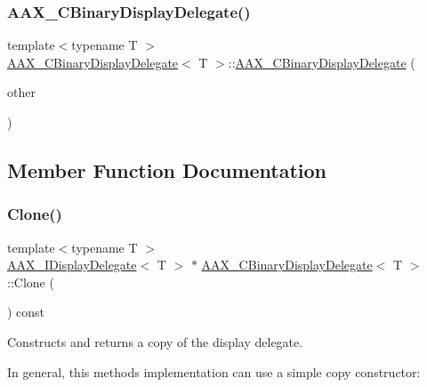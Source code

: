 \subsubsection{\texorpdfstring{AAX\_CBinaryDisplayDelegate()}{AAX\_CBinaryDisplayDelegate()}\hspace{0.1cm}{\footnotesize\ttfamily [2/2]}}
{\footnotesize\ttfamily template$<$typename T $>$ \\
\mbox{\hyperlink{a01449}{A\+A\+X\+\_\+\+C\+Binary\+Display\+Delegate}}$<$ T $>$\+::\mbox{\hyperlink{a01449}{A\+A\+X\+\_\+\+C\+Binary\+Display\+Delegate}} (\begin{DoxyParamCaption}\item[{const \mbox{\hyperlink{a01449}{A\+A\+X\+\_\+\+C\+Binary\+Display\+Delegate}}$<$ T $>$ \&}]{other }\end{DoxyParamCaption})}



\subsection{Member Function Documentation}
\mbox{\label{a01449_ac0f060429501b13e2f79babbcfdda9ab}} 
\subsubsection{\texorpdfstring{Clone()}{Clone()}}
{\footnotesize\ttfamily template$<$typename T $>$ \\
\mbox{\hyperlink{a01801}{A\+A\+X\+\_\+\+I\+Display\+Delegate}}$<$ T $>$ $\ast$ \mbox{\hyperlink{a01449}{A\+A\+X\+\_\+\+C\+Binary\+Display\+Delegate}}$<$ T $>$\+::Clone (\begin{DoxyParamCaption}{ }\end{DoxyParamCaption}) const\hspace{0.3cm}{\ttfamily [virtual]}}



Constructs and returns a copy of the display delegate. 

In general, this method\textquotesingle{}s implementation can use a simple copy constructor\+:


\begin{DoxyCode}{0}
\DoxyCodeLine{\textcolor{keyword}{}\{}
\DoxyCodeLine{\}}
\end{DoxyCode}
 

